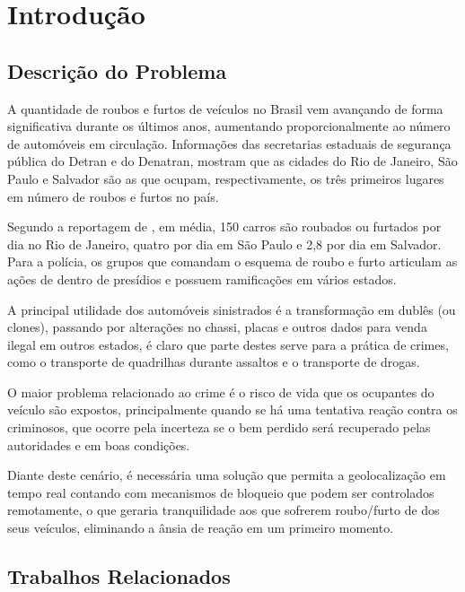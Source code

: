 \chapter {Introdu\c{c}\~{a}o}
\label{cap:introducao}

\section{Descri\c{c}\~{a}o do Problema}

A quantidade de roubos e furtos de veículos no Brasil vem avançando de forma 
significativa durante os últimos anos, aumentando proporcionalmente ao número 
de automóveis em circulação. Informações das secretarias estaduais de 
segurança pública do Detran e do Denatran, mostram que as cidades do Rio de Janeiro, São Paulo e Salvador são as que ocupam, respectivamente, os três primeiros lugares em número de roubos e furtos no país.

Segundo a reportagem de \textcite{borges:2011}, em média, 150 carros são 
roubados ou furtados por dia no Rio de Janeiro, quatro por dia em São Paulo e 
2,8 por dia em Salvador. Para a polícia, os grupos que comandam o esquema de
roubo e furto articulam as ações de dentro de presídios e possuem ramificações
em vários estados. 

A principal utilidade dos automóveis sinistrados é a transformação em dublês (ou clones), passando por alterações no chassi, placas e outros dados para venda ilegal em outros estados, é claro que parte destes serve para a prática de crimes, como o transporte de quadrilhas durante assaltos e o transporte de drogas.

O maior problema relacionado ao crime é o risco de vida que os ocupantes do veículo são expostos, principalmente quando se há uma tentativa reação contra os criminosos, que ocorre pela incerteza se o bem perdido será recuperado pelas autoridades e em boas condições.

Diante deste cenário, é necessária uma solução que permita a geolocalização em tempo real contando com mecanismos de bloqueio que podem ser controlados remotamente, o que geraria tranquilidade aos que sofrerem roubo/furto de dos seus veículos, eliminando a ânsia de reação em um primeiro momento.

\hfill

\section{Trabalhos Relacionados}	

